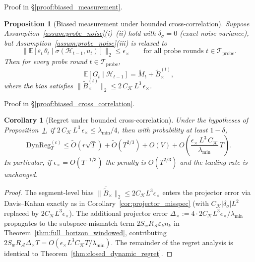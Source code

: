 \documentclass{article}
\newcommand{\E}{\mathbb{E}}
\newcommand{\cA}{\mathcal{A}}
\newcommand{\cH}{\mathcal{H}}
\newcommand{\cTprobe}{\mathcal{T}_{\mathrm{probe}}}
\newcommand{\DynReg}{\mathrm{DynReg}}
\newtheorem{corollary}{Corollary}
\newtheorem{proposition}{Proposition}
\begin{document}
Proof in \S\ref{proof:biased_measurement}.
 \begin{proposition}[Biased measurement under bounded cross-correlation]
  \label{prop:biased_cross_correlation}
  Suppose Assumption~\ref{assum:probe_noise}(i)--(ii) hold with $\delta_\sigma=0$
  (exact noise variance), but Assumption~\ref{assum:probe_noise}(iii) is relaxed to
  \[
  \bigl\|\E[\varepsilon_t\,\theta_t \mid \sigma(\cH_{t-1},u_t)]\bigr\|_2 \le \epsilon_\times
  \qquad \text{for all probe rounds } t \in \cTprobe.
  \]
  Then for every probe round $t\in\cTprobe$,
  \[
  \E[G_t \mid \cH_{t-1}] = \widetilde M_t + \widetilde B_\times^{(t)},
  \]
  where the bias satisfies $\|\widetilde B_\times^{(t)}\|_2 \le 2\,C_{\mathcal K}\,L^3\,\epsilon_\times$.
  \end{proposition}
Proof in \S\ref{proof:biased_cross_correlation}.


  \begin{corollary}[Regret under bounded cross-correlation]
  \label{cor:regret_cross_correlation}
  Under the hypotheses of Proposition~\ref{prop:biased_cross_correlation},
  if $2\,C_{\mathcal K}\,L^3\,\epsilon_\times \le \lambda_{\min}/4$, then
  with probability at least $1-\delta$,
  \[
  \DynReg_T^{(c)}
  \le \widetilde O(r\sqrt{T}) + \widetilde O(T^{2/3}) + O(V)
  + O\!\left(\frac{\epsilon_\times\,L^3\,C_{\mathcal K}}{\lambda_{\min}}\,T\right).
  \]
  In particular, if $\epsilon_\times = O(T^{-1/3})$ the penalty is
  $O(T^{2/3})$ and the leading rate is unchanged.
  \end{corollary}

  \begin{proof}
  The segment-level bias $\|\bar{\widetilde B}_\times\|_2 \le 2C_{\mathcal K}L^3\epsilon_\times$
  enters the projector error via Davis--Kahan exactly as in Corollary~\ref{cor:projector_misspec}
  (with $C_{\mathcal K}|\delta_\sigma|L^2$ replaced by $2C_{\mathcal K}L^3\epsilon_\times$).
  The additional projector error $\Delta_\times := 4\cdot 2C_{\mathcal K}L^3\epsilon_\times/\lambda_{\min}$
  propagates to the subspace-mismatch term $2S_wR_{\cA}\varepsilon_k n_k$ in
  Theorem~\ref{thm:full_horizon_windowed}, contributing $2S_wR_{\cA}\Delta_\times T
  = O(\epsilon_\times L^3 C_{\mathcal K} T/\lambda_{\min})$.
  The remainder of the regret analysis is identical to Theorem~\ref{thm:closed_dynamic_regret}.
  \end{proof}
\end{document}
